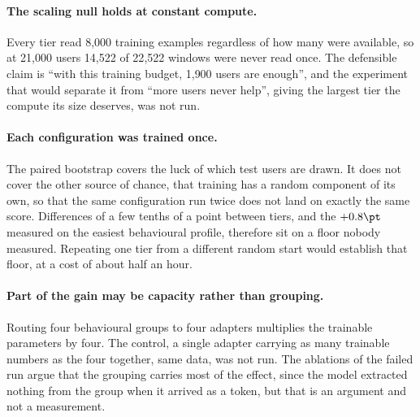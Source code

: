 \paragraph{The scaling null holds at constant compute.} Every tier read 8{,}000
training examples regardless of how many were available, so at 21{,}000 users
14{,}522 of 22{,}522 windows were never read once. The defensible claim is
``with this training budget, 1{,}900 users are enough'', and the experiment that
would separate it from ``more users never help'', giving the largest tier the
compute its size deserves, was not run.

\paragraph{Each configuration was trained once.} The paired bootstrap covers
the luck of which test users are drawn. It does not cover the other source of
chance, that training has a random component of its own, so that the same
configuration run twice does not land on exactly the same score. Differences of
a few tenths of a point between tiers, and the $+0.8\pt$ measured on the
easiest behavioural profile, therefore sit on a floor nobody measured.
Repeating one tier from a different random start would establish that floor, at
a cost of about half an hour.

\paragraph{Part of the gain may be capacity rather than grouping.} Routing four
behavioural groups to four adapters multiplies the trainable parameters by four.
The control, a single adapter carrying as many trainable numbers as the four
together, same data, was not run.
The ablations of the failed run argue that the grouping carries most of the
effect, since the model extracted nothing from the group when it arrived as a
token, but that is an argument and not a measurement.

